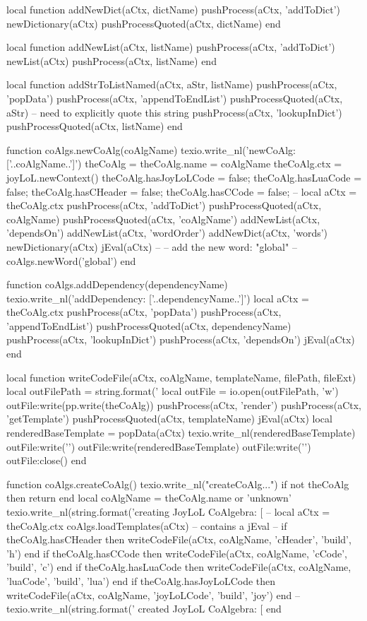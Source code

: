 local function addNewDict(aCtx, dictName)
  pushProcess(aCtx, 'addToDict')
  newDictionary(aCtx)
  pushProcessQuoted(aCtx, dictName)
end

local function addNewList(aCtx, listName)
  pushProcess(aCtx, 'addToDict')
  newList(aCtx)
  pushProcess(aCtx, listName)
end

local function addStrToListNamed(aCtx, aStr, listName)
  pushProcess(aCtx, 'popData')
  pushProcess(aCtx, 'appendToEndList')
  pushProcessQuoted(aCtx, aStr) -- need to explicitly quote this string
  pushProcess(aCtx, 'lookupInDict')
  pushProcessQuoted(aCtx, listName)
end

function coAlgs.newCoAlg(coAlgName)
  texio.write_nl('newCoAlg: ['..coAlgName..']')
  theCoAlg               = {}
  theCoAlg.name          = coAlgName
  theCoAlg.ctx           = joyLoL.newContext()
  theCoAlg.hasJoyLoLCode = false;
  theCoAlg.hasLuaCode    = false;
  theCoAlg.hasCHeader    = false;
  theCoAlg.hasCCode      = false;
  -- 
  local aCtx = theCoAlg.ctx
  pushProcess(aCtx, 'addToDict')
  pushProcessQuoted(aCtx, coAlgName)
  pushProcessQuoted(aCtx, 'coAlgName')
  addNewList(aCtx, 'dependsOn')
  addNewList(aCtx, 'wordOrder')
  addNewDict(aCtx, 'words')
  newDictionary(aCtx)
  jEval(aCtx)
  --
  -- add the new word: "global"
  --
  coAlgs.newWord('global')
end

function coAlgs.addDependency(dependencyName)
  texio.write_nl('addDependency: ['..dependencyName..']')
  local aCtx = theCoAlg.ctx
  pushProcess(aCtx, 'popData')
  pushProcess(aCtx, 'appendToEndList')
  pushProcessQuoted(aCtx, dependencyName)
  pushProcess(aCtx, 'lookupInDict')
  pushProcess(aCtx, 'dependsOn')
  jEval(aCtx)
end

local function writeCodeFile(aCtx, coAlgName, templateName, filePath, fileExt)
  local outFilePath = string.format('%
  local outFile = io.open(outFilePath, 'w')
  outFile:write(pp.write(theCoAlg))
  pushProcess(aCtx, 'render')
  pushProcess(aCtx, 'getTemplate')
  pushProcessQuoted(aCtx, templateName)
  jEval(aCtx)
  local renderedBaseTemplate = popData(aCtx)
  texio.write_nl(renderedBaseTemplate)
  outFile:write('\n')
  outFile:write(renderedBaseTemplate)
  outFile:write('\n')
  outFile:close()
end

function coAlgs.createCoAlg()
  texio.write_nl("createCoAlg...")
  if not theCoAlg then return end
  local coAlgName = theCoAlg.name or 'unknown'
  texio.write_nl(string.format('creating JoyLoL CoAlgebra: [%
  --
  local aCtx = theCoAlg.ctx
  coAlgs.loadTemplates(aCtx) -- contains a jEval
  --
  if theCoAlg.hasCHeader    then writeCodeFile(aCtx, coAlgName, 'cHeader',    'build', 'h')   end
  if theCoAlg.hasCCode      then writeCodeFile(aCtx, coAlgName, 'cCode',      'build', 'c')   end
  if theCoAlg.hasLuaCode    then writeCodeFile(aCtx, coAlgName, 'luaCode',    'build', 'lua') end
  if theCoAlg.hasJoyLoLCode then writeCodeFile(aCtx, coAlgName, 'joyLoLCode', 'build', 'joy') end
  --
  texio.write_nl(string.format(' created JoyLoL CoAlgebra: [%
end

